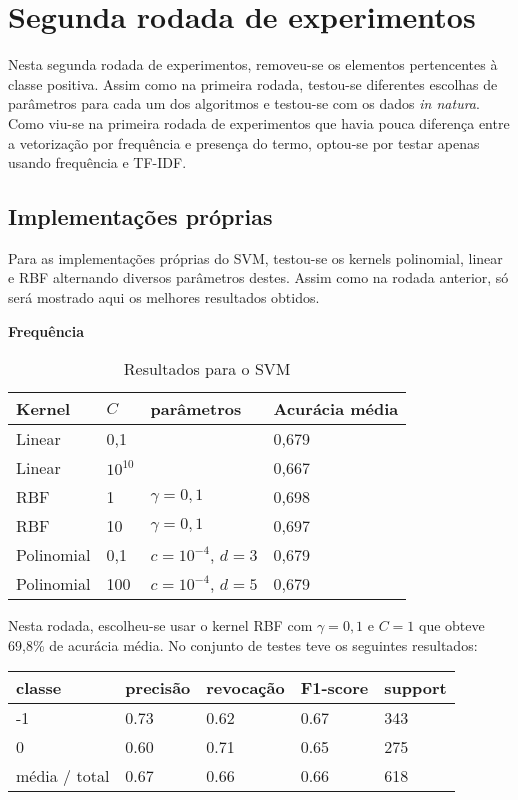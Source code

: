 \section{Segunda rodada de experimentos}
\label{sec:second_experiments}

Nesta segunda rodada de experimentos, removeu-se os elementos pertencentes à classe positiva.
Assim como na primeira rodada, testou-se diferentes escolhas de parâmetros para cada um dos
algoritmos e testou-se com os dados \textit{in natura}. Como viu-se na primeira rodada de experimentos
que havia pouca diferença entre a vetorização por frequência e presença do termo, optou-se por testar
apenas usando frequência e TF-IDF.

\subsection{Implementações próprias}

Para as implementações próprias do SVM, testou-se os kernels polinomial, linear e RBF alternando
diversos parâmetros destes. Assim como na rodada anterior, só será mostrado aqui os melhores resultados
obtidos. 

\textbf{Frequência}

\begin{table}[H]
	\centering
	\caption{Resultados para o SVM}
	\begin{tabular}{l l l l}
		\hline
		Kernel & $C$ & parâmetros & Acurácia média \\
		\hline
		Linear & 0,1 & & 0,679 \\
		\hline
		Linear & $10^{10}$ & & 0,667 \\
		\hline
		RBF & 1 & $\gamma = 0,1$ & 0,698 \\
		\hline
		RBF & 10 & $\gamma = 0,1$ & 0,697 \\
		\hline
		Polinomial & 0,1 & $c = 10^{-4}$, $d = 3$ & 0,679 \\
		\hline
		Polinomial & 100 & $c = 10^{-4}$, $d = 5$ & 0,679 \\
		\hline
	\end{tabular}
\end{table}

Nesta rodada, escolheu-se usar o kernel RBF com $\gamma = 0,1$ e $C = 1$ que obteve 69,8\% de acurácia média. No
conjunto de testes teve os seguintes resultados:

\begin{table}[H]
	\centering
		\begin{tabular}{l | l | l | l | l}
		\hline
		classe  	&	precisão  &  revocação &  F1-score &  support \\
		\hline
		 -1    &   0.73   &   0.62   &   0.67   &    343 \\
		 \hline
          0    &   0.60   &   0.71   &   0.65   &    275 \\
		\hline
		média / total   &    0.67   &   0.66   &   0.66   &    618 \\
		\hline
	\end{tabular}
\end{table}


